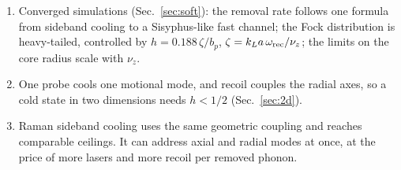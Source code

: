 \documentclass[11pt,a4paper]{article}
\begin{document}
\begin{enumerate}
\item Converged simulations (Sec.~\ref{sec:soft}): the removal rate follows one formula from sideband cooling to a Sisyphus-like fast channel; the Fock distribution is heavy-tailed, controlled by $h=0.188\,\zeta/b_p$, $\zeta=k_La\,\omega_{\rm rec}/\nu_z$; the limits on the core radius scale with $\nu_z$.
\item One probe cools one motional mode, and recoil couples the radial axes, so a cold state in two dimensions needs $h<1/2$ (Sec.~\ref{sec:2d}).
\item Raman sideband cooling uses the same geometric coupling and reaches comparable ceilings. It can address axial and radial modes at once, at the price of more lasers and more recoil per removed phonon.
\end{enumerate}



\end{document}
